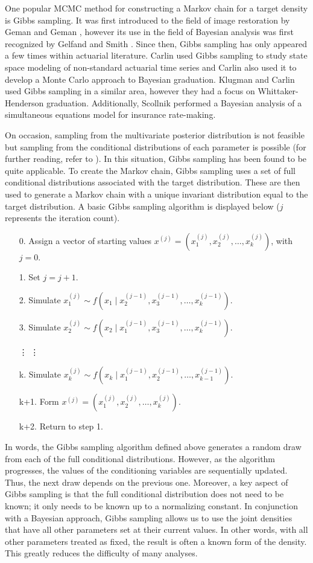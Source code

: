 \documentclass[11pt, oneside]{article}
\begin{document}
One popular MCMC method for constructing a Markov chain for a target density is Gibbs sampling. It was first introduced to the field of image restoration by Geman and Geman \cite{Geman and Geman}, however its use in the field of Bayesian analysis was first recognized by Gelfand and Smith \cite{Gelfand and Smith}. Since then, Gibbs sampling has only appeared a few times within actuarial literature. Carlin \cite{Carlin1} used Gibbs sampling to study state space modeling of non-standard actuarial time series and Carlin \cite{Carlin2} also used it to develop a Monte Carlo approach to Bayesian graduation. Klugman and Carlin \cite{Klugman and Carlin} used Gibbs sampling in a similar area, however they had a focus on Whittaker-Henderson graduation. Additionally, Scollnik \cite{Scollnik} performed a Bayesian analysis of a simultaneous equations model for insurance rate-making.

On occasion, sampling from the multivariate posterior distribution is not feasible but sampling from the conditional distributions of each parameter is possible (for further reading, refer to \cite{Besag}). In this situation, Gibbs sampling has been found to be quite applicable. To create the Markov chain, Gibbs sampling uses a set of full conditional distributions associated with the target distribution. These are then used to generate a Markov chain with a unique invariant distribution equal to the target distribution. A basic Gibbs sampling algorithm is displayed below ($j$ represents the iteration count).
\begin{enumerate}
\item[0.] Assign a vector of starting values $x^{(j)}=(x^{(j)}_1,x^{(j)}_2,\ldots,x^{(j)}_k)$, with $j=0$.
\item[1.] Set $j = j + 1$.
\item[2.] Simulate $x^{(j)}_1\sim f(x_1\mid x^{(j-1)}_2,x^{(j-1)}_3,\ldots,x^{(j-1)}_k).$
\item[3.] Simulate $x^{(j)}_2\sim f(x_2\mid x^{(j-1)}_1,x^{(j-1)}_3,\ldots,x^{(j-1)}_k).$
\item[\vdots]\hspace{1.6 cm}\vdots
\item[k.] Simulate $x^{(j)}_k\sim f(x_k\mid x^{(j-1)}_1,x^{(j-1)}_2,\ldots,x^{(j-1)}_{k-1}).$
\item[k+1.] Form $x^{(j)}=(x^{(j)}_1,x^{(j)}_2,\ldots,x^{(j)}_k).$
\item[k+2.] Return to step 1$.$
\end{enumerate}
In words, the Gibbs sampling algorithm defined above generates a random draw from each of the full conditional distributions. However, as the algorithm progresses, the values of the conditioning variables are sequentially updated. Thus, the next draw depends on the previous one. Moreover, a key aspect of Gibbs sampling is that the full conditional distribution does not need to be known; it only needs to be known up to a normalizing constant. In conjunction with a Bayesian approach, Gibbs sampling allows us to use the joint densities that have all other parameters set at their current values. In other words, with all other parameters treated as fixed, the result is often a known form of the density. This greatly reduces the difficulty of many analyses.
\end{document}
